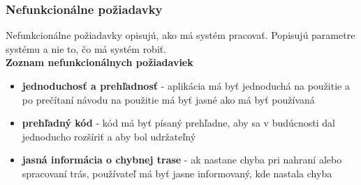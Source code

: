\subsubsection{Nefunkcionálne požiadavky}
\indent \indent Nefunkcionálne požiadavky opisujú, ako má systém pracovať. Popisujú parametre systému a nie to, čo má systém robiť.\\
\textbf{Zoznam nefunkcionálnych požiadaviek}
\begin{itemize}
    \item \textbf{jednoduchosť a prehľadnosť} - aplikácia má byť jednoduchá na použitie a po prečítaní návodu na použitie má byť jasné ako má byť používaná
    \item \textbf{prehľadný kód} - kód má byť písaný prehľadne, aby sa v budúcnosti dal jednoducho rozšíriť a aby bol udržateľný
    \item \textbf{jasná informácia o chybnej trase} - ak nastane chyba pri nahraní alebo spracovaní trás, používateľ má byť jasne informovaný, kde nastala chyba
\end{itemize}
